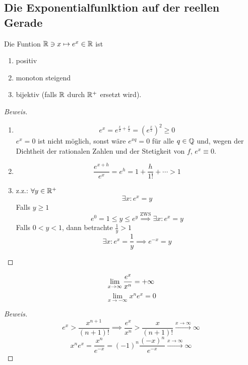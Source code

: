 \subsection{Die Exponentialfunlktion auf der reellen Gerade}

\begin{Sat} Die Funtion $\mathbb{R}\ni x \mapsto e^x \in \mathbb{R}$ ist
  \begin{enumerate}
    \item positiv
    \item monoton steigend
    \item bijektiv (falls $\mathbb{R}$ durch $\mathbb{R}^+$ ersetzt wird).
  \end{enumerate}
\end{Sat}
\begin{proof}[Beweis]
  \begin{enumerate}
    \item \[e^x=e^{\frac{x}{2}+\frac{x}{2}} = (e^\frac{x}{2})^2 \geq 0\]
$e^x = 0$ ist nicht m\"oglich, sonst w\"are $e^{xq}=0$ f\"ur alle 
$q\in \mathbb{Q}$ und, wegen der Dichtheit der rationalen Zahlen und
der Stetigkeit von $f$, $e^x\equiv 0$.
    \item \[\frac{e^{x+h}}{e^x}=e^h=1+\frac{h}{1!}+\cdots > 1\]
    \item z.z.: $\forall y\in\mathbb{R}^+$
      \[\exists x: e^x=y\]
      Falls $y\geq 1$
      \[e^0=1\leq y\leq e^y\stackrel{\text{ZWS}}{\implies}\exists x:e^x=y\]
      Falls $0<y<1$, dann betrachte $\frac{1}{y}>1$
      \[\exists x: e^x=\frac{1}{y}\implies e^{-x}=y\]
  \end{enumerate}
\end{proof}
\begin{Sat}\label{s:wachstum1}
  \[\displaystyle\lim_{x\rightarrow\infty}\frac{e^x}{x^n}=+\infty\]
  \[\lim_{x\to-\infty}x^ne^x=0\]
\end{Sat}
\begin{proof}[Beweis]
  \[e^x>\frac{x^{n+1}}{(n+1)!}\implies\frac{e^x}{x^n}>\frac{x}{(n+1)!}\stackrel{x\to\infty}{\to}\infty\]
  \[x^ne^x=\frac{x^n}{e^{-x}}=(-1)^n\frac{(-x)^n}{e^{-x}}\stackrel{x\to\infty}{\to}\infty\]
\end{proof}
